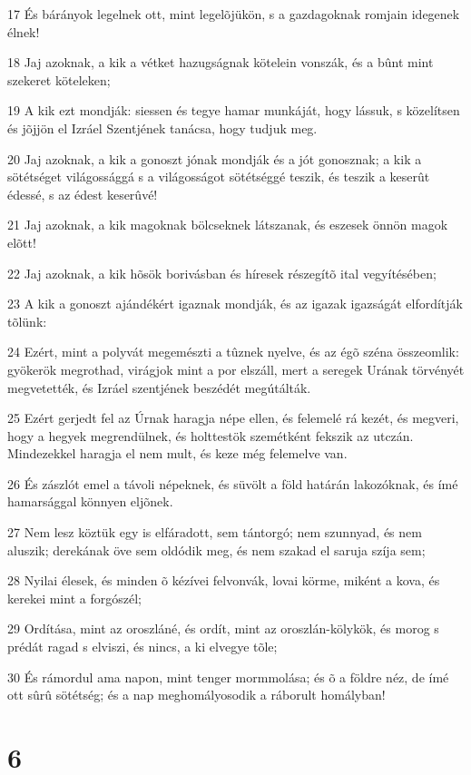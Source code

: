 \par 17 És bárányok legelnek ott, mint legelõjükön, s a gazdagoknak romjain idegenek élnek!
\par 18 Jaj azoknak, a kik a vétket hazugságnak kötelein vonszák, és a bûnt mint szekeret köteleken;
\par 19 A kik ezt mondják: siessen és tegye hamar munkáját, hogy lássuk, s közelítsen és jõjjön el Izráel Szentjének tanácsa, hogy tudjuk meg.
\par 20 Jaj azoknak, a kik a gonoszt jónak mondják és a jót gonosznak; a kik a sötétséget világossággá s a világosságot sötétséggé teszik, és teszik a keserût édessé, s az édest keserûvé!
\par 21 Jaj azoknak, a kik magoknak bölcseknek látszanak, és eszesek önnön magok elõtt!
\par 22 Jaj azoknak, a kik hõsök borivásban és híresek részegítõ ital vegyítésében;
\par 23 A kik a gonoszt ajándékért igaznak mondják, és az igazak igazságát elfordítják tõlünk:
\par 24 Ezért, mint a polyvát megemészti a tûznek nyelve, és az égõ széna összeomlik: gyökerök megrothad, virágjok mint a por elszáll, mert a seregek Urának törvényét megvetették, és Izráel szentjének beszédét megútálták.
\par 25 Ezért gerjedt fel az Úrnak haragja népe ellen, és felemelé rá kezét, és megveri, hogy a hegyek megrendülnek, és holttestök szemétként fekszik az utczán. Mindezekkel haragja el nem mult, és keze még felemelve van.
\par 26 És zászlót emel a távoli népeknek, és süvölt a föld határán lakozóknak, és ímé hamarsággal könnyen eljõnek.
\par 27 Nem lesz köztük egy is elfáradott, sem tántorgó; nem szunnyad, és nem aluszik; derekának öve sem oldódik meg, és nem szakad el saruja szíja sem;
\par 28 Nyilai élesek, és minden õ kézívei felvonvák, lovai körme, miként a kova, és kerekei mint a forgószél;
\par 29 Ordítása, mint az oroszláné, és ordít, mint az oroszlán-kölykök, és morog s prédát ragad s elviszi, és nincs, a ki elvegye tõle;
\par 30 És rámordul ama napon, mint tenger mormmolása; és õ a földre néz, de ímé ott sûrû sötétség; és a nap meghomályosodik a ráborult homályban!

\chapter{6}

